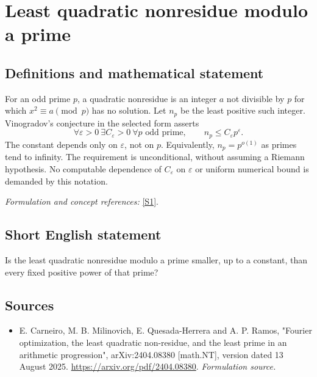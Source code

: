 \documentclass[11pt]{article}
\begin{document}
\section*{Least quadratic nonresidue modulo a prime}\label{3100069}
\subsection{Definitions and mathematical statement}
For an odd prime $p$, a quadratic nonresidue is an integer $a$ not divisible by $p$ for which $x^2\equiv a\pmod p$ has no solution. Let $n_p$ be the least positive such integer. Vinogradov's conjecture in the selected form asserts
\[
 \forall{\varepsilon}>0\ \exists C_{\varepsilon}>0\ \forall p\text{ odd prime},
 \qquad n_p\le C_{\varepsilon} p^{\varepsilon}.
\]
The constant depends only on ${\varepsilon}$, not on $p$. Equivalently, $n_p=p^{o(1)}$ as primes tend to infinity. The requirement is unconditional, without assuming a Riemann hypothesis. No computable dependence of $C_{\varepsilon}$ on ${\varepsilon}$ or uniform numerical bound is demanded by this notation.
\par\smallskip\textit{Formulation and concept references:} \href{https://arxiv.org/pdf/2404.08380}{[S1]}.

\subsection{Short English statement}
Is the least quadratic nonresidue modulo a prime smaller, up to a constant, than every fixed positive power of that prime?
\subsection{Sources}
\begin{itemize}
\item[S1]E. Carneiro, M. B. Milinovich, E. Quesada-Herrera and A. P. Ramos, "Fourier optimization, the least quadratic non-residue, and the least prime in an arithmetic progression", arXiv:2404.08380 [math.NT], version dated 13 August 2025.
\url{https://arxiv.org/pdf/2404.08380}.
\textit{Formulation source.}
\end{itemize}
\end{document}
